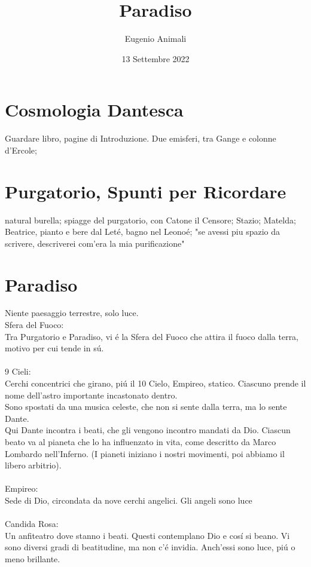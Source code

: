 \documentclass{article}
\title{Paradiso}
\author{Eugenio Animali}
\date{13 Settembre 2022}
\begin{document}
\maketitle

\section*{Cosmologia Dantesca}

Guardare libro, pagine di Introduzione.
Due emisferi, tra Gange e colonne d'Ercole;

\section*{Purgatorio, Spunti per Ricordare}
natural burella; spiagge del purgatorio, con Catone il Censore; Stazio; Matelda; Beatrice, pianto e bere dal Leté, bagno nel Leonoé; "se avessi piu spazio da scrivere, descriverei com'era la mia purificazione"

\section*{Paradiso}
Niente paesaggio terrestre, solo luce.\\
Sfera del Fuoco:\\
Tra Purgatorio e Paradiso, vi é la Sfera del Fuoco che attira il fuoco dalla terra, motivo per cui tende in sú.\\
\\
9 Cieli:\\
Cerchi concentrici che girano, piú il 10 Cielo, Empireo, statico.
Ciascuno prende il nome dell'astro importante incastonato dentro.\\
Sono spostati da una musica celeste, che non si sente dalla terra, ma lo sente Dante.\\
Qui Dante incontra i beati, che gli vengono incontro mandati da Dio. Ciascun beato va al pianeta che lo ha influenzato in vita, come descritto da Marco Lombardo nell'Inferno. (I pianeti iniziano i nostri movimenti, poi abbiamo il libero arbitrio).\\
\\
Empireo:\\
Sede di Dio, circondata da nove cerchi angelici. Gli angeli sono luce\\
\\
Candida Rosa:\\
Un anfiteatro dove stanno i beati. Questi contemplano Dio e cosí si beano. Vi sono diversi gradi di beatitudine, ma non c'é invidia. Anch'essi sono luce, piú o meno brillante.
\end{document}
